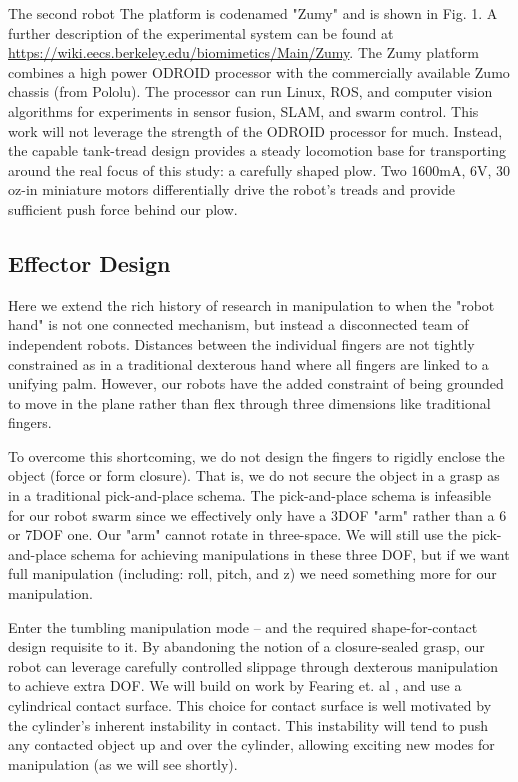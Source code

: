 \documentclass[runningheads,a4paper]{llncs}
\begin{document}
The second robot The platform is codenamed "Zumy" and is shown in Fig. 1.
A further description of the experimental system can be found at \url{https://wiki.eecs.berkeley.edu/biomimetics/Main/Zumy}.
The Zumy platform combines a high power ODROID processor with the commercially available Zumo chassis (from Pololu).
The processor can run Linux, ROS, and computer vision algorithms for experiments in sensor fusion, SLAM, and swarm control.
This work will not leverage the strength of the ODROID processor for much.
Instead, the capable tank-tread design provides a steady locomotion base for transporting around the real focus of this study: a carefully shaped plow.
Two 1600mA, 6V, 30 oz-in miniature motors differentially drive the robot's treads and provide sufficient push force behind our plow.

\subsection{Effector Design}

Here we extend the rich history of research in manipulation to when the "robot hand" is not one connected mechanism, but instead a disconnected team of independent robots.
Distances between the individual fingers are not tightly constrained as in a traditional dexterous hand where all fingers are linked to a unifying palm.
However, our robots have the added constraint of being grounded to move in the plane rather than flex through three dimensions like traditional fingers.

To overcome this shortcoming, we do not design the fingers to rigidly enclose the object (force or form closure).
That is, we do not secure the object in a grasp as in a traditional pick-and-place schema.
The pick-and-place schema is infeasible for our robot swarm since we effectively only have a 3DOF "arm" rather than a 6 or 7DOF one. Our "arm" cannot rotate in three-space.
We will still use the pick-and-place schema for achieving manipulations in these three DOF, but if we want full manipulation (including: roll, pitch, and z) we need something more for our manipulation.

Enter the tumbling manipulation mode -- and the required shape-for-contact design requisite to it.
By abandoning the notion of a closure-sealed grasp, our robot can leverage carefully controlled slippage through dexterous manipulation to achieve extra DOF.
We will build on work by Fearing et. al \cite{fearing1986simplified}, and use a cylindrical contact surface.
This choice for contact surface is well motivated by the cylinder's inherent instability in contact.
This instability will tend to push any contacted object up and over the cylinder, allowing exciting new modes for manipulation (as we will see shortly).
\end{document}
